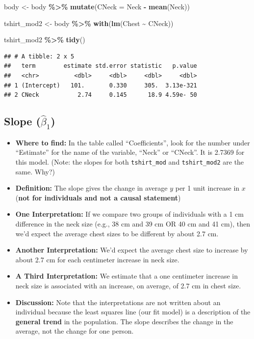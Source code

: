 \documentclass[
]{book}
\newenvironment{Shaded}{\begin{snugshade}}{\end{snugshade}}
\newcommand{\AttributeTok}[1]{\textcolor[rgb]{0.13,0.29,0.53}{#1}}
\newcommand{\FunctionTok}[1]{\textcolor[rgb]{0.13,0.29,0.53}{\textbf{#1}}}
\newcommand{\NormalTok}[1]{#1}
\newcommand{\OtherTok}[1]{\textcolor[rgb]{0.56,0.35,0.01}{#1}}
\newcommand{\SpecialCharTok}[1]{\textcolor[rgb]{0.81,0.36,0.00}{\textbf{#1}}}
\providecommand{\tightlist}{%
  \setlength{\itemsep}{0pt}\setlength{\parskip}{0pt}}
\begin{document}
\begin{Shaded}
\begin{Highlighting}[]
\NormalTok{body }\OtherTok{\textless{}{-}}\NormalTok{ body }\SpecialCharTok{\%\textgreater{}\%} 
  \FunctionTok{mutate}\NormalTok{(}\AttributeTok{CNeck =}\NormalTok{ Neck }\SpecialCharTok{{-}} \FunctionTok{mean}\NormalTok{(Neck))}

\NormalTok{tshirt\_mod2 }\OtherTok{\textless{}{-}}\NormalTok{ body }\SpecialCharTok{\%\textgreater{}\%}
  \FunctionTok{with}\NormalTok{(}\FunctionTok{lm}\NormalTok{(Chest }\SpecialCharTok{\textasciitilde{}}\NormalTok{ CNeck))}
       
\NormalTok{tshirt\_mod2 }\SpecialCharTok{\%\textgreater{}\%}
  \FunctionTok{tidy}\NormalTok{()}
\end{Highlighting}
\end{Shaded}

\begin{verbatim}
## # A tibble: 2 x 5
##   term        estimate std.error statistic   p.value
##   <chr>          <dbl>     <dbl>     <dbl>     <dbl>
## 1 (Intercept)   101.       0.330     305.  3.13e-321
## 2 CNeck           2.74     0.145      18.9 4.59e- 50
\end{verbatim}

\subsection{\texorpdfstring{Slope (\(\hat{\beta}_1\))}{Slope (\textbackslash hat\{\textbackslash beta\}\_1)}}\label{slope-hatbeta_1}

\begin{itemize}
\tightlist
\item
  \textbf{Where to find:} In the table called ``Coefficients'', look for the number under ``Estimate'' for the name of the variable, ``Neck'' or ``CNeck''. It is 2.7369 for this model. (Note: the slopes for both \texttt{tshirt\_mod} and \texttt{tshirt\_mod2} are the same. Why?)
\item
  \textbf{Definition:} The slope gives the change in average \(y\) per 1 unit increase in \(x\) (\textbf{not for individuals and not a causal statement})
\item
  \textbf{One Interpretation:} If we compare two groups of individuals with a 1 cm difference in the neck size (e.g., 38 cm and 39 cm OR 40 cm and 41 cm), then we'd expect the average chest sizes to be different by about 2.7 cm.
\item
  \textbf{Another Interpretation:} We'd expect the average chest size to increase by about 2.7 cm for each centimeter increase in neck size.
\item
  \textbf{A Third Interpretation:} We estimate that a one centimeter increase in neck size is associated with an increase, on average, of 2.7 cm in chest size.
\item
  \textbf{Discussion:} Note that the interpretations are not written about an individual because the least squares line (our fit model) is a description of the \textbf{general trend} in the population. The slope describes the change in the average, not the change for one person.
\end{itemize}
\end{document}

